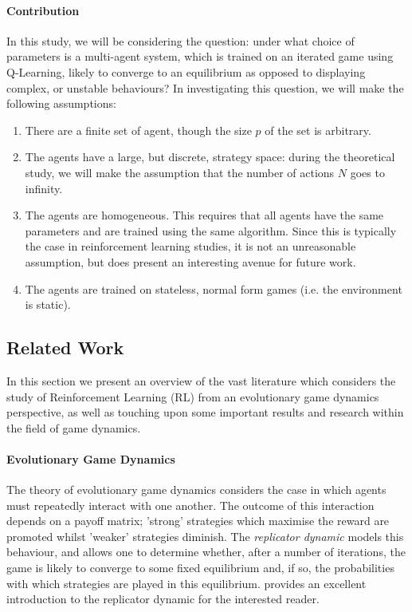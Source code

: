 \documentclass[sigconf,anonymous]{aamas}
\begin{document}
\paragraph{Contribution}
In this study, we will be considering the question: under what choice of parameters is a
multi-agent system, which is trained on an iterated game using Q-Learning, likely to converge to an
equilibrium as opposed to displaying complex, or unstable behaviours? In investigating this question, we will make the
following assumptions:

\begin{enumerate}
    \item There are a finite set of agent, though the size $p$ of the set is arbitrary. 
    \item The agents have a large, but discrete, strategy space: during the theoretical study, we
    will make the assumption that the number of actions $N$ goes to infinity.
    \item The agents are homogeneous. This requires that all agents have the same parameters and are
    trained using the same algorithm. Since this is typically the case in reinforcement learning
    studies, it is not an unreasonable assumption, but does present an interesting avenue for future
    work.
    \item The agents are trained on stateless, normal form games (i.e. the environment is static).
\end{enumerate}


\subsection{Related Work}

In this section we present an overview of the vast literature which considers the study of Reinforcement Learning (RL) from an evolutionary game dynamics perspective, as well as touching upon some important results and research within the field of game dynamics.

\paragraph{Evolutionary Game Dynamics} The theory of evolutionary game dynamics \cite{Morgenstern44} considers the case in which agents must repeatedly interact with one another. The outcome of this interaction depends on a payoff matrix; 'strong' strategies which maximise the reward are promoted whilst 'weaker' strategies diminish. The \textit{replicator dynamic} models this behaviour, and allows one to determine whether, after a number of iterations, the game is likely to converge to some fixed equilibrium and, if so, the probabilities with which strategies are played in this equilibrium. \cite{ShohamMultiagentFoundations} provides an excellent introduction to the replicator dynamic for the interested reader.
\end{document}
